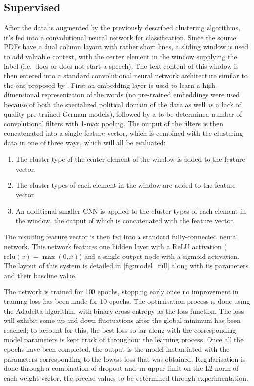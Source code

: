 \subsection{Supervised}%
\label{sec:sup}
After the data is augmented by the previously described clustering algorithms,
it's fed into a convolutional neural network for classification. Since the
source PDFs have a dual column layout with rather short lines, a sliding window
is used to add valuable context, with the center element in the window supplying
the label (i.e.\ does or does not start a speech). The text content of this
window is then entered into a standard convolutional neural network architecture
similar to the one proposed by \textcite{kim2014conv}.  First an embedding layer
is used to learn a high-dimensional representation of the words (no pre-trained
embeddings were used because of both the specialized political domain of the
data as well as a lack of quality pre-trained German models), followed by a
to-be-determined number of convolutional filters with 1-max pooling. The output
of the filters is then concatenated into a single feature vector, which is
combined with the clustering data in one of three ways, which will all be
evaluated:
\begin{enumerate}
  \item The cluster type of the center element of the window is added to the
    feature vector.
  \item The cluster types of each element in the window are added to the
    feature vector.
  \item An additional smaller CNN is applied to the cluster types of each
    element in the window, the output of which is concatenated with the feature
    vector.
\end{enumerate}
The resulting feature vector is then fed into a standard fully-connected neural
network. This network features one hidden layer with a ReLU activation
($\mathrm{relu}(x) = \max(0, x)$) and a single output node with a sigmoid
activation. The layout of this system is detailed in \cref{fig:model_full} along
with its parameters and their baseline value.

The network is trained for 100 epochs, stopping early once no improvement in
training loss has been made for 10 epochs. The optimisation process is done
using the Adadelta\citep{adadelta} algorithm, with binary cross-entropy as the
loss function.  The loss will exhibit some up and down fluctuations after the
global minimum has been reached; to account for this, the best loss so far along
with the corresponding model parameters is kept track of throughout the learning
process. Once all the epochs have been completed, the output is the model
instantiated with the parameters corresponding to the lowest loss that was
obtained. Regularisation is done through a combination of dropout\citep{dropout}
and an upper limit on the L2 norm of each weight vector\citep{l2norm}, the
precise values to be determined through experimentation.

